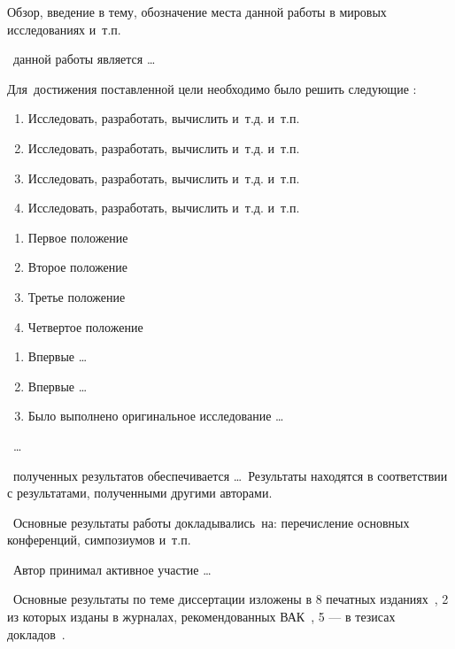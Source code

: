 {\actuality}
Обзор, введение в тему, обозначение места данной работы в мировых исследованиях и~т.\:п.

 \aim\ данной работы является \ldots

Для~достижения поставленной цели необходимо было решить следующие {\tasks}:
\begin{enumerate}
  \item Исследовать, разработать, вычислить и~т.\:д. и~т.\:п.
  \item Исследовать, разработать, вычислить и~т.\:д. и~т.\:п.
  \item Исследовать, разработать, вычислить и~т.\:д. и~т.\:п.
  \item Исследовать, разработать, вычислить и~т.\:д. и~т.\:п.
\end{enumerate}

\begin{enumerate}
  \item Первое положение
  \item Второе положение
  \item Третье положение
  \item Четвертое положение
\end{enumerate}

\novelty
\begin{enumerate}
  \item Впервые \ldots
  \item Впервые \ldots
  \item Было выполнено оригинальное исследование \ldots
\end{enumerate}

\influence\ \ldots

\reliability\ полученных результатов обеспечивается \ldots \ Результаты находятся в соответствии с результатами, полученными другими авторами.

\probation\
Основные результаты работы докладывались~на:
перечисление основных конференций, симпозиумов и~т.\:п.

\contribution\ Автор принимал активное участие \ldots

\publications\ Основные результаты по теме диссертации изложены в 8 печатных изданиях~\cite{skalko2014, tsybulin2015a, tsybulin2015b},
2 из которых изданы в журналах, рекомендованных ВАК~\cite{skalko2014,tsybulin2015a}, 
5 --- в тезисах докладов~\cite{miptconf53,miptconf54,miptconf55,miptconf56,miptconf57}.

